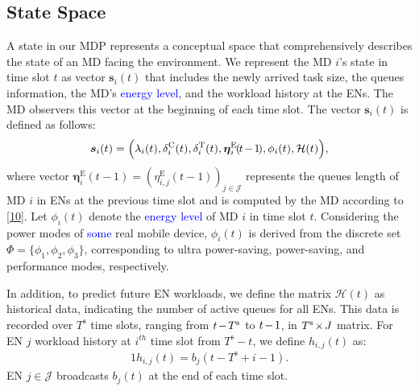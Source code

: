 \documentclass[10pt, journal,letterpaper]{IEEEtran}
\begin{document}
\subsection{State Space}
A state in our MDP represents a conceptual space that comprehensively describes the state of an MD facing the environment. We represent the MD $i$'s state in time slot $t$ as vector $\boldsymbol{s}_i(t)$ that includes the newly arrived task size, the queues information, the MD's \textcolor{blue}{energy level}, and the workload history at the ENs. The MD observers this vector at the beginning of each time slot. The vector $\boldsymbol{s}_i(t)$ is defined as follows:
\begin{alignat}{1}
\boldsymbol{s}_i(t) = \Big(\lambda_i(t), \delta_i^{\text{C}}(t), \delta_i^{\text{T}}(t), \boldsymbol{\eta}_i^{\text{E}}\hspace{-0.4mm}(\hspace{-0.4mm}t\hspace{-0.4mm}-\hspace{-0.4mm}1\hspace{-0.5mm}),\phi_i(t), \mathcal{H}(t) \Big),
	\label{18}
\end{alignat}
where vector $\boldsymbol{\eta}_i^{\text{E}}(t-1) = (\eta_{i,j}^{\text{E}}(t-1))_{j \in \mathcal{J}}$ represents the queues length of MD $i$ in ENs at the previous time slot and is computed by the MD according to \eqref{10}. Let $\phi_i(t)$ denote the \textcolor{blue}{energy level} of MD $i$ in time slot $t$. Considering the power modes of \textcolor{blue}{some} real mobile device, $\phi_i(t)$ is derived from the discrete set $\Phi=\{\phi_1,\phi_2,\phi_3\}$, corresponding to ultra power-saving, power-saving, and performance modes, respectively.

In addition, to predict future EN workloads, we define the matrix $\mathcal{H}(t)$ as historical data, indicating the number of active queues for all ENs. This data is recorded over $T^{\text{s}}$ time slots, ranging from $t\hspace{-0.4mm}-\hspace{-0.4mm}T^{\text{s}}$ to $t\hspace{-0.4mm}-\hspace{-0.4mm}1$, in $T^{\text{s}}\hspace{-0.4mm}\times \hspace{-0.4mm} J$ matrix. For EN $j$ workload history at $i^{th}$ time slot from $T^{\text{s}}-t$, we define $h_{i,j}(t)$ as:
\begin{alignat}{1}
	h_{i,j}(t) = b_j(t - T^{\text{s}} + i - 1).
	\label{19}
\end{alignat}
EN $j \in \mathcal{J}$ broadcasts $b_j(t)$ at the end of each time slot. %
\end{document}
